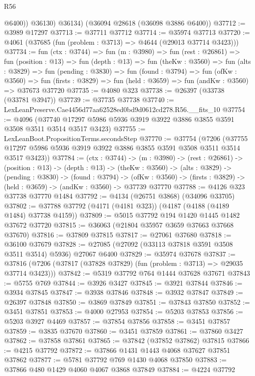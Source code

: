 \begin{lexlean}{R56}
\begin{coremodule}
            @6400))
        @36130)
      @36134)
    (@36094 @28618 (@36098 @3886 @6400))
@37712 := @3989 @17297
@37713 := @37711 @37712
@37714 := @35974 @37713
@37720 := @4061 (@37685 (fun (problem : @3713) => @4644 (@29013 @37714 @3423)))
@37734 := fun (ctx : @3744) =>
  fun (m : @3980) =>
  fun (rest : @26861) =>
  fun (position : @13) =>
  fun (depth : @13) =>
  fun (theKw : @3560) =>
  fun (alts : @3829) =>
  fun (pending : @3830) =>
  fun (found : @3794) =>
  fun (ofKw : @3560) =>
  fun (firsts : @3829) => fun (held : @3659) => fun (andKw : @3560) => @37673 @37720
@37735 := @4080 @323
@37738 := @26397 (@33738 (@33781 @3947))
@37739 := @37735 @37738
@37740 := LexLeanPreserve.Cae4456d77aa62528ed0bd9d0612cd278.R56.__fits_10
@37754 := @4096
    (@37740 @17297 @5986 @5936 @3919 @3922 @3886 @3855 @3591 @3508 @3511 @3514 @3517 @3423)
@37755 := LexLeanBoot.PropositionTerms.secondsStep
@37770 := @37754
    (@7206 (@37755 @17297 @5986 @5936 @3919 @3922 @3886 @3855 @3591 @3508 @3511 @3514 @3517 @3423))
@37784 := (ctx : @3744) ->
  (m : @3980) ->
  (rest : @26861) ->
  (position : @13) ->
  (depth : @13) ->
  (theKw : @3560) ->
  (alts : @3829) ->
  (pending : @3830) ->
  (found : @3794) ->
  (ofKw : @3560) -> (firsts : @3829) -> (held : @3659) -> (andKw : @3560) -> @37739 @37770
@37788 := @4126 @323 @37738 @37770 @1484
@37792 := @4134 (@26751 @3868) (@34096 @33705)
@37802 := @37788 @37792 (@4171 (@4181 @323)) (@4187 (@4188 (@4189 @1484) @37738 @4159))
@37809 := @5015 @37792 @194 @1420 @1445 @1482 @37672 @37720
@37815 := @36063 (@21804 @35957 @3659 @37663 @37668 @37670)
@37816 := @37809 @37815
@37817 := @27061 @37680
@37818 := @36100 @37679
@37828 := @27085 (@27092 (@33113 @37818 @3591 @3508 @3511 @3514) @5936) @27067 @6400
@37829 := @35974 @37678
@37837 := @37816 (@7206 (@37817 (@37828 @37829) (fun (problem : @3713) => @29035 @37714 @3423)))
@37842 := @5319 @37792 @764 @1444 @37628 @37671
@37843 := @5755 @769
@37844 := @3926 @3427
@37845 := @3921 @37844
@37846 := @3934 @37845
@37847 := @3938 @37846
@37848 := @3932 @37847
@37849 := @26397 @37848
@37850 := @3869 @37849
@37851 := @37843 @37850
@37852 := @3451 @37851
@37853 := @4000 @27953
@37854 := @5203 @37853
@37856 := @5203 @3927 @4469
@37857 := @37854 @37856
@37858 := @3451 @37857
@37859 := @3835 @37670
@37860 := @3451 @37859
@37861 := @37860 @3427
@37862 := @37858 @37861
@37865 := @37842 (@37852 @37862) @37815
@37866 := @4215 @37792
@37872 := @37866 @1431 @1443 @4068 @37627 @37851 @37862
@37877 := @5781 @37792 @769 @1430 @4068 @37850
@37883 := @37866 @480 @1429 @4060 @4067 @3868 @37849
@37884 := @4224 @37792

\end{coremodule}
\end{lexlean}
